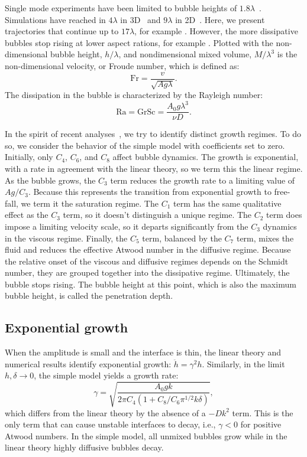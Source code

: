 Single mode experiments have been limited to bubble heights of $1.8\lambda$~\cite{Wilkinson2007}.
Simulations have reached in $4\lambda$ in 3D~\cite{Ramaprabhu2012} and $9\lambda$ in 2D~\cite{Wei2012}.
Here, we present trajectories that continue up to $17\lambda$, for example .
However, the more dissipative bubbles stop rising at lower aspect rations, for example .
Plotted with the non-dimensional bubble height, $h / \lambda$, and nondimensional mixed volume, $M / \lambda^3$ is the non-dimensional velocity, or Froude number, which is defined as:
\begin{equation}
  \text{Fr} = \frac{v}{\sqrt{A g \lambda}}.
\end{equation}
The dissipation in the bubble is characterized by the Rayleigh number:
\begin{equation}
  \text{Ra} = \text{Gr} \text{Sc} = \frac{A_0 g \lambda^3}{\nu D}.
\end{equation}

In the spirit of recent analyses~\cite{Ramaprabhu2012, Wei2012}, we try to identify distinct growth regimes.
To do so, we consider the behavior of the simple model with coefficients set to zero.
Initially, only $C_4$, $C_6$, and $C_8$ affect bubble dynamics.
The growth is exponential, with a rate in agreement with the linear theory, so we term this the linear regime.
As the bubble grows, the $C_3$ term reduces the growth rate to a limiting value of $A g / C_3$.
Because this represents the transition from exponential growth to free-fall, we term it the saturation regime.
The $C_1$ term has the same qualitative effect as the $C_3$ term, so it doesn't distinguish a unique regime.
The $C_2$ term does impose a limiting velocity scale, so it departs significantly from the $C_3$ dynamics in the viscous regime.
Finally, the $C_5$ term, balanced by the $C_7$ term, mixes the fluid and reduces the effective Atwood number in the diffusive regime.
Because the relative onset of the viscous and diffusive regimes depends on the Schmidt number, they are grouped together into the dissipative regime.
Ultimately, the bubble stops rising.
The bubble height at this point, which is also the maximum bubble height, is called the penetration depth.

\subsection{Exponential growth}
When the amplitude is small and the interface is thin, the linear theory and numerical results identify exponential growth: $\ddot{h} = \gamma^2 h$.
Similarly, in the limit $h, \delta \rightarrow 0$, the simple model yields a growth rate:
\begin{equation}
\gamma = \sqrt{\frac{A_0 g k}{2 \pi C_4(1 + C_8 / C_6 \pi^{1/2} k \delta)}},
\end{equation}
which differs from the linear theory by the absence of a $-D k^2$ term.
This is the only term that can cause unstable interfaces to decay, i.e., $\gamma < 0$ for positive Atwood numbers.
In the simple model, all unmixed bubbles grow while in the linear theory highly diffusive bubbles decay.

